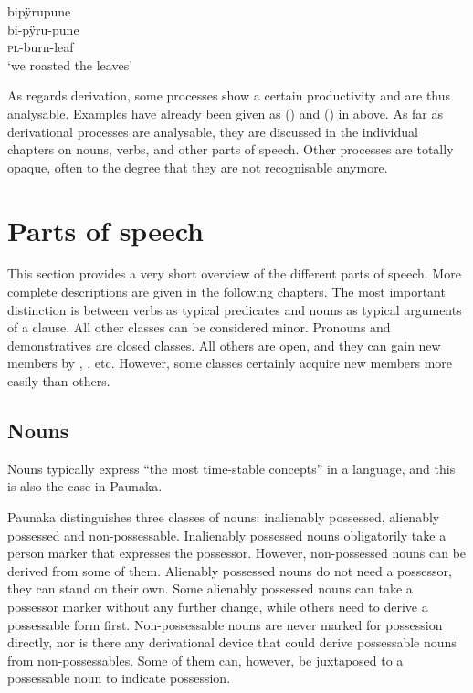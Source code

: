 \ea\label{ex:new23-incorporation}
\begingl
\glpreamble bipÿrupune\\
\gla bi-pÿru-pune\\
\textsc{pl}-burn-leaf\\
\glft ‘we roasted the leaves’
\endgl
\trailingcitation{[rxx-p181101l-2.223]}
\xe
{}

As regards derivation, some processes show a certain productivity and are thus an\-a\-lys\-able. Examples have already been given as () and () in  above. As far as derivational processes are an\-a\-lys\-able, they are discussed in the individual chapters on nouns, verbs, and other parts of speech. Other processes are totally opaque, often to the degree that they are not recognisable anymore. 


\section{Parts of speech}\label{sec:POS}

This section provides a very short overview of the different parts of speech. More complete descriptions are given in the following chapters. The most important distinction is between verbs as typical predicates and nouns as typical arguments of a clause. All other classes can be considered minor. Pronouns and demonstratives are closed classes. All others are open, and they can gain new members by , ,  etc. However, some classes certainly acquire new members more easily than others.

\subsection{Nouns}\label{sec:POS_Nouns}

Nouns typically express “the most time-stable concepts” \citep[33]{Payne1997} in a language, and this is also the case in Paunaka.

Paunaka distinguishes three classes of nouns: inalienably possessed, alienably possessed and non-possessable. Inalienably possessed nouns obligatorily take a person marker that expresses the possessor. However, non-possessed nouns can be derived from some of them. Alienably possessed nouns do not need a possessor, they can stand on their own. Some alienably possessed nouns can take a possessor marker without any further change, while others need to derive a possessable form first. Non-possessable nouns are never marked for possession directly, nor is there any derivational device that could derive possessable nouns from non-possessables. Some of them can, however, be juxtaposed to a possessable noun to indicate possession.

